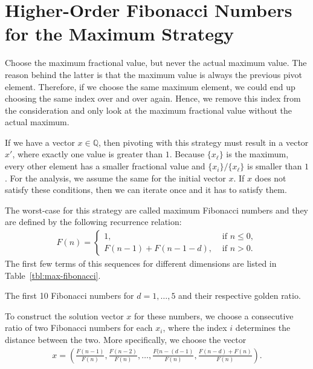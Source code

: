 \section{Higher-Order Fibonacci Numbers for the Maximum Strategy}

Choose the maximum fractional value, but never the actual maximum value.
The reason behind the latter is that the maximum value is always the previous
pivot element.
Therefore, if we choose the same maximum element, we could end up choosing the
same index over and over again.
Hence, we remove this index from the consideration and only look at the maximum
fractional value without the actual maximum.

If we have a vector $x ∈ ℚ$, then pivoting with this strategy must result in a
vector $x'$, where exactly one value is greater than $1$.
Because $\{x_ℓ\}$ is the maximum, every other element has a smaller fractional
value and $\{x_i\}/\{x_ℓ\}$ is smaller than $1$.
For the analysis, we assume the same for the initial vector $x$.
If $x$ does not satisfy these conditions, then we can iterate once and it has
to satisfy them.

The worst-case for this strategy are called maximum Fibonacci numbers and they
are defined by the following recurrence relation:
\begin{align*}
  F(n) =
  \begin{cases}
    1, & \text{ if } n ≤ 0, \\
    F(n - 1) + F(n - 1 - d), & \text{ if } n > 0.
  \end{cases}
\end{align*}
The first few terms of this sequences for different dimensions are listed in
Table~\ref{tbl:max-fibonacci}.

\begin{table}[tbp]
  \caption{The first 10 Fibonacci numbers for $d = 1, …, 5$ and their respective golden ratio.}
  \label{tbl:max-fibonacci}
  \centering
  
\end{table}

To construct the solution vector $x$ for these numbers, we choose a consecutive
ratio of two Fibonacci numbers for each $x_i$, where the index $i$ determines
the distance between the two.
More specifically, we choose the vector
\begin{align*}
  x = \left(
    \frac{F(n-1)}{F(n)},
    \frac{F(n-2)}{F(n)},
    …,
    \frac{F(n-(d-1)}{F(n)},
    \frac{F(n-d) + F(n)}{F(n)} \right).
\end{align*}

